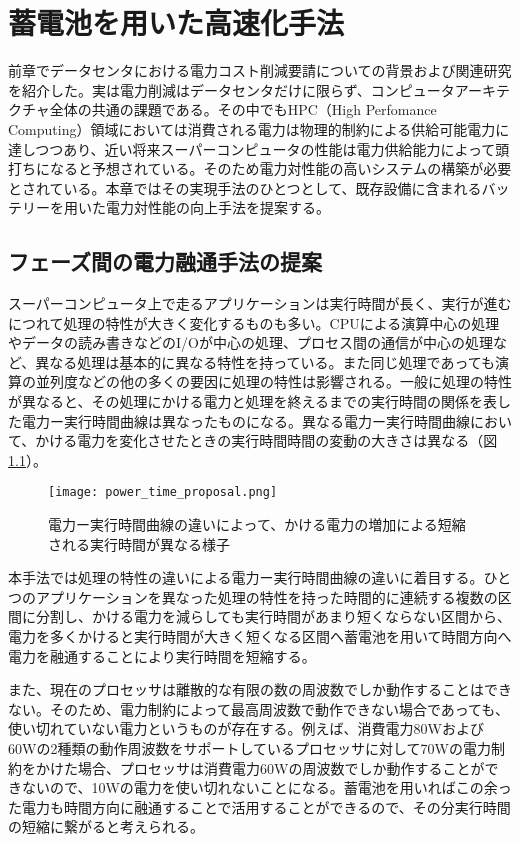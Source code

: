\chapter{蓄電池を用いた高速化手法}
\label{chap:proposal}

前章でデータセンタにおける電力コスト削減要請についての背景および関連研究を紹介した。実は電力削減はデータセンタだけに限らず、コンピュータアーキテクチャ全体の共通の課題である。その中でもHPC（High Perfomance Computing）領域においては消費される電力は物理的制約による供給可能電力に達しつつあり、近い将来スーパーコンピュータの性能は電力供給能力によって頭打ちになると予想されている。そのため電力対性能の高いシステムの構築が必要とされている。本章ではその実現手法のひとつとして、既存設備に含まれるバッテリーを用いた電力対性能の向上手法を提案する。


\section{フェーズ間の電力融通手法の提案}
\label{sec:curb}

スーパーコンピュータ上で走るアプリケーションは実行時間が長く、実行が進むにつれて処理の特性が大きく変化するものも多い。CPUによる演算中心の処理やデータの読み書きなどのI/Oが中心の処理、プロセス間の通信が中心の処理など、異なる処理は基本的に異なる特性を持っている。また同じ処理であっても演算の並列度などの他の多くの要因に処理の特性は影響される。一般に処理の特性が異なると、その処理にかける電力と処理を終えるまでの実行時間の関係を表した電力ー実行時間曲線は異なったものになる。異なる電力ー実行時間曲線において、かける電力を変化させたときの実行時間時間の変動の大きさは異なる（図\ref{fig:power_time_proposal}）。

\begin{figure}[t]
 \begin{center}
  \texttt{[image: power\_time\_proposal.png]}
 \end{center}
 \caption{電力ー実行時間曲線の違いによって、かける電力の増加による短縮される実行時間が異なる様子}
 \label{fig:power_time_proposal}
\end{figure}

本手法では処理の特性の違いによる電力ー実行時間曲線の違いに着目する。ひとつのアプリケーションを異なった処理の特性を持った時間的に連続する複数の区間に分割し、かける電力を減らしても実行時間があまり短くならない区間から、電力を多くかけると実行時間が大きく短くなる区間へ蓄電池を用いて時間方向へ電力を融通することにより実行時間を短縮する。

また、現在のプロセッサは離散的な有限の数の周波数でしか動作することはできない。そのため、電力制約によって最高周波数で動作できない場合であっても、使い切れていない電力というものが存在する。例えば、消費電力80Wおよび60Wの2種類の動作周波数をサポートしているプロセッサに対して70Wの電力制約をかけた場合、プロセッサは消費電力60Wの周波数でしか動作することができないので、10Wの電力を使い切れないことになる。蓄電池を用いればこの余った電力も時間方向に融通することで活用することができるので、その分実行時間の短縮に繋がると考えられる。

